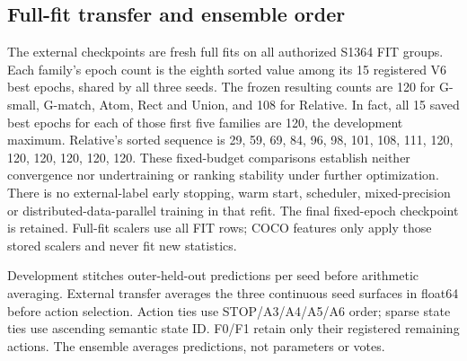 \subsection{Full-fit transfer and ensemble order}
The external checkpoints are fresh full fits on all authorized S1364 FIT
groups. Each family's epoch count is the eighth sorted value among its 15
registered V6 best epochs, shared by all three seeds. The frozen resulting
counts are 120 for G-small, G-match, Atom, Rect and Union, and 108 for
Relative. In fact, all 15 saved best epochs for each of those first five
families are 120, the development maximum. Relative's sorted sequence is
29, 59, 69, 84, 96, 98, 101, 108, 111, 120, 120, 120, 120, 120, 120.
These fixed-budget comparisons establish neither convergence nor
undertraining or ranking stability under further optimization.
There is no external-label early stopping, warm start, scheduler,
mixed-precision or distributed-data-parallel training in that refit. The
final fixed-epoch checkpoint is retained. Full-fit scalers use all FIT rows;
COCO features only apply those stored scalers and never fit new statistics.

Development stitches outer-held-out predictions per seed before arithmetic
averaging. External transfer averages the three continuous seed surfaces in
float64 before action selection. Action ties use STOP/A3/A4/A5/A6 order;
sparse state ties use ascending semantic state ID. F0/F1 retain only their
registered remaining actions. The ensemble averages predictions, not
parameters or votes.
